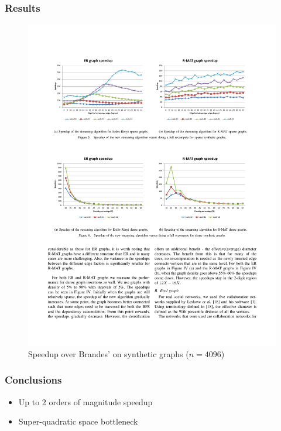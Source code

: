 \begin{frame}
  \frametitle{Results}
  
  \begin{figure}[t]
    \centering
    \includegraphics[width=\textwidth, height=0.7\textheight, keepaspectratio]{imgs/green-results1}
    \caption{Speedup over Brandes' on synthetic graphs ($n = 4096$)}
  \end{figure}
    
\end{frame}


\begin{frame}
  \frametitle{Conclusions}

  \begin{itemize}
    \item Up to 2 orders of magnitude speedup
    \item Super-quadratic space bottleneck
  \end{itemize}
    
\end{frame}


